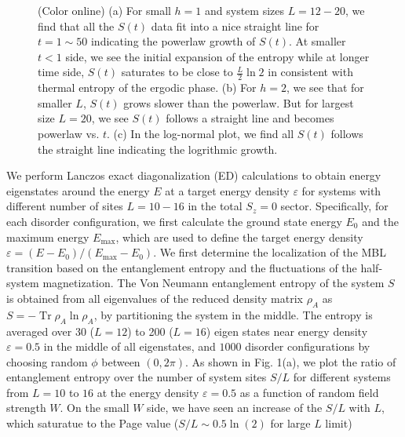 \documentclass[prl,aps,epsf,showpacs,twocolumn]{revtex4}
\DeclareMathOperator{\tr}{Tr}
\begin{document}
\begin{figure}[b]
  \caption{(Color online) (a) For small $h=1$ and system sizes $L=12-20$,   we
    find that all the $S(t)$ data fit into a nice straight line for $t=1\sim 50$
    indicating the powerlaw growth of $S(t)$.  At smaller $t<1$ side,  we see
    the initial expansion of the entropy  while at longer time  side, $S(t)$
    saturates to be close to $\frac L 2 \ln2$ in consistent with thermal entropy
    of the ergodic phase.  (b) For $h=2$,  we see that for smaller $L$, $S(t)$
    grows slower than the powerlaw.  But for largest size $L=20$, we see $S(t)$
    follows a straight line and becomes powerlaw vs. $t$.  (c) In the log-normal
    plot, we find all $S(t)$ follows the straight line indicating the logrithmic
    growth.
  }
\label{fig5}
\end{figure} 


We  perform Lanczos exact diagonalization (ED) calculations   to obtain  energy
eigenstates around  the energy $E$ at a target  energy  density $\varepsilon$
for  systems with different  number of sites $L=10-16$  in the total $S_z=0$
sector.  Specifically, for each disorder configuration, we first calculate the
ground state energy  $E_0$ and the maximum energy $E_\text{max}$, which are
used to define the target energy density $\varepsilon = (E-E_0)/(E_\text{max}
-E_0)$.
We first determine the localization of the MBL transition based on the
entanglement entropy and the fluctuations of the half-system
magnetization\cite{luitz2015}.  The Von Neumann entanglement entropy of the
system  $S$ is obtained  from all eigenvalues of the reduced density matrix
$\rho_A$ as $S=- \tr \rho_A \ln \rho_A$, by partitioning the system in  the
middle.  The entropy is averaged over 30 ($L=12$) to 200 ($L=16$) eigen states
near energy density $\varepsilon=0.5$ in the middle of all eigenstates,   and
$1000$ disorder configurations by choosing random $\phi$ between $(0, 2\pi)$.
As shown in  Fig. 1(a), we plot the  ratio of  entanglement entropy over the
number of system sites  $S/L$ for  different systems  from $L=10$ to $16$  at
the energy density $\varepsilon =0.5$ as a function of random field strength
$W$.  On the  small $W$ side, we have seen an increase of the $S/L$ with $L$,
which saturatue to the Page value ($S/L \sim 0.5\ln(2)$ for large $L$ limit)
\end{document}
